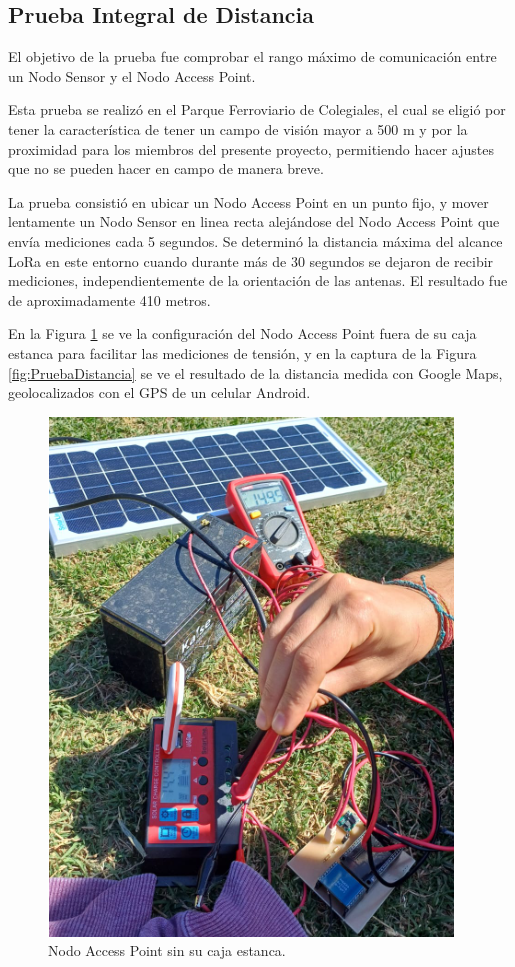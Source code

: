 \subsection{Prueba Integral de Distancia}

El objetivo de la prueba fue comprobar el rango máximo de comunicación entre un Nodo Sensor y el Nodo Access Point.

Esta prueba se realizó en el Parque Ferroviario de Colegiales, el cual se eligió por tener la característica de tener un campo de visión mayor a 500 m y por la proximidad para los miembros del presente proyecto, permitiendo hacer ajustes que no se pueden hacer en campo de manera breve.

La prueba consistió en ubicar un Nodo Access Point en un punto fijo, y mover lentamente un Nodo Sensor en linea recta alejándose del Nodo Access Point que envía mediciones cada 5 segundos.  Se determinó la distancia máxima del alcance LoRa en este entorno cuando durante más de 30 segundos se dejaron de recibir mediciones, independientemente de la orientación de las antenas. El resultado fue de aproximadamente 410 metros.

En la Figura \ref{fig:NodoAp-PruebaDistancia} se ve la configuración del Nodo Access Point fuera de su caja estanca para facilitar las mediciones de tensión, y en la captura de la Figura \ref{fig:PruebaDistancia} se ve el resultado de la distancia medida con Google Maps, geolocalizados con el GPS de un celular Android.

\begin{figure}[H]
	\centering
	\includegraphics[scale=1]{./Figures/Pruebas/NodoAP-Pruebadistancia.PNG}
	\caption{Nodo Access Point sin su caja estanca.}
	\label{fig:NodoAp-PruebaDistancia}
\end{figure}

